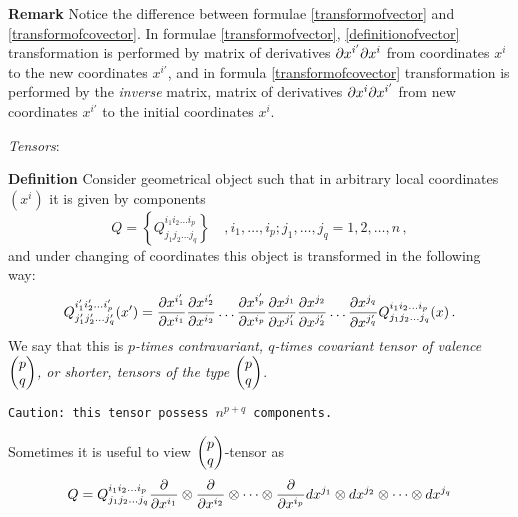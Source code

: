 \documentclass[12pt]{article}
\theoremstyle{theorem}
\numberwithin{equation}{section}
\begin{document}
{\bf Remark}  Notice the difference between formulae
\eqref{transformofvector} and \eqref{transformofcovector}.
In formulae \eqref{transformofvector}, \eqref{definitionofvector} 
transformation is performed
by matrix of derivatives ${\partial x^{i'}\partial x^i}$ from coordinates
    $x^i$ to the new coordinates $x^{i'}$, and
in formula \eqref{transformofcovector} transformation is performed
by the {\it inverse }matrix, matrix  of derivatives ${\partial x^{i}\partial x^{i'}}$ 
from new coordinates
    $x^{i'}$ to the initial coordinates $x^{i}$.

\m


          {\it Tensors}:




\smallskip

{\bf Definition}  
   Consider geometrical object
    such that in arbitrary local coordinates
   $(x^i)$
it is given by components
    $$
 Q=\left\{
    Q^{i_1i_2\dots i_p}_{j_1j_2\dots j_q}
        \right\}\quad,  i_1,\dots, i_p;j_1,\dots,j_q=1,2,\dots,n\,,
        $$
and under changing of coordinates this object is transformed in the following
way:
      \begin{equation}\label{ruleoftransformationofarbitrarytensors}
    Q^{i'_1i'_2\dots i'_p}_{j'_1j'_2\dots j'_q}(x')=
    {\partial x^{i'_1}\over \partial x^{i_1}}
    {\partial x^{i'_2}\over \partial x^{i_2}}
    \dots
    {\partial x^{i'_p}\over \partial x^{i_p}}
    {\partial x^{j_1}\over \partial x^{j'_1}}
    {\partial x^{j_2}\over \partial x^{j'_2}}
    \dots
    {\partial x^{j_q}\over \partial x^{j'_q}}
    Q^{i_1i_2\dots i_p}_{j_1j_2\dots j_q}(x)\,.
\end{equation}
We say that  this is
   {\it $p$-times contravariant, $q$-times covariant
tensor of valence $\begin{pmatrix} p\cr q\cr\end{pmatrix}$,
or shorter, 
 tensors of the type  $\begin{pmatrix} p\cr q\cr\end{pmatrix}$}.

{\tt Caution: this tensor possess $n^{p+q}$ components.}
 
\smallskip

Sometimes it is useful
to view  
 $\begin{pmatrix} p\cr q\cr\end{pmatrix}$-tensor as
       \begin{equation*}
 Q= Q^{i_1i_2\dots i_p}_{j_1j_2\dots j_q}
      {\partial\over \partial x^{i_1}}\otimes
      {\partial\over \partial x^{i_2}}\otimes\dots
      \otimes{\partial\over \partial x^{i_p}}
             dx^{j_1}\otimes
             dx^{j_2}\otimes\dots
             \otimes dx^{j_q}
          \end{equation*}       
\end{document}
